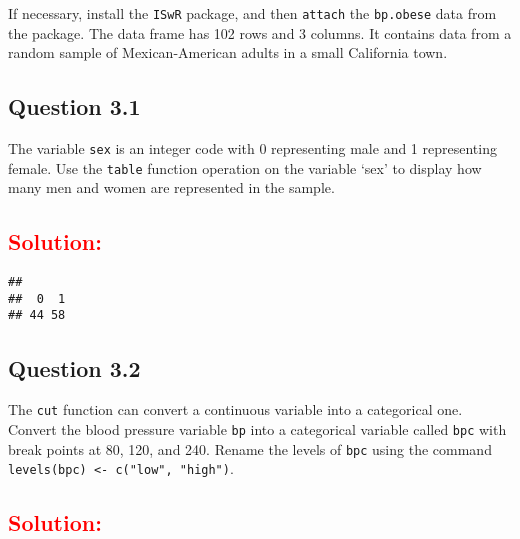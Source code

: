 \documentclass[]{article}
\newenvironment{Shaded}{\begin{snugshade}}{\end{snugshade}}
\newcommand{\KeywordTok}[1]{\textcolor[rgb]{0.13,0.29,0.53}{\textbf{#1}}}
\newcommand{\StringTok}[1]{\textcolor[rgb]{0.31,0.60,0.02}{#1}}
\newcommand{\OperatorTok}[1]{\textcolor[rgb]{0.81,0.36,0.00}{\textbf{#1}}}
\newcommand{\NormalTok}[1]{#1}
\begin{document}
If necessary, install the \texttt{ISwR} package, and then
\texttt{attach} the \texttt{bp.obese} data from the package. The data
frame has 102 rows and 3 columns. It contains data from a random sample
of Mexican-American adults in a small California town.

\subsection{Question 3.1}\label{question-3.1}

The variable \texttt{sex} is an integer code with 0 representing male
and 1 representing female. Use the \texttt{table} function operation on
the variable `sex' to display how many men and women are represented in
the sample.

\subsection{\texorpdfstring{\textcolor{red}{Solution:}}{}}\label{section-8}

\begin{Shaded}
\end{Shaded}

\begin{verbatim}
## 
##  0  1 
## 44 58
\end{verbatim}

\subsection{Question 3.2}\label{question-3.2}

The \texttt{cut} function can convert a continuous variable into a
categorical one. Convert the blood pressure variable \texttt{bp} into a
categorical variable called \texttt{bpc} with break points at 80, 120,
and 240. Rename the levels of \texttt{bpc} using the command
\texttt{levels(bpc)\ \textless{}-\ c("low",\ "high")}.

\subsection{\texorpdfstring{\textcolor{red}{Solution:}}{}}\label{section-9}
\end{document}
